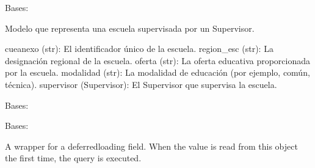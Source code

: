 \documentclass[letterpaper,10pt,spanish]{sphinxmanual}
\begin{document}
\begin{fulllineitems}

\pysigstartsignatures
{}
\pysigstopsignatures
\sphinxAtStartPar
Bases: 

\sphinxAtStartPar
Modelo que representa una escuela supervisada por un Supervisor.
\begin{description}
\sphinxAtStartPar
cueanexo (str): El identificador único de la escuela.
region\_esc (str): La designación regional de la escuela.
oferta (str): La oferta educativa proporcionada por la escuela.
modalidad (str): La modalidad de educación (por ejemplo, común, técnica).
supervisor (Supervisor): El Supervisor que supervisa la escuela.

\end{description}


\begin{fulllineitems}

\pysigstartsignatures
{}
\pysigstopsignatures
\sphinxAtStartPar
Bases: 

\end{fulllineitems}



\begin{fulllineitems}

\pysigstartsignatures
{}
\pysigstopsignatures
\sphinxAtStartPar
Bases: 

\end{fulllineitems}



\begin{fulllineitems}

\pysigstartsignatures
{}
\pysigstopsignatures
\sphinxAtStartPar
A wrapper for a deferred\sphinxhyphen{}loading field. When the value is read from this
object the first time, the query is executed.


\end{fulllineitems}
\end{fulllineitems}
\end{document}
